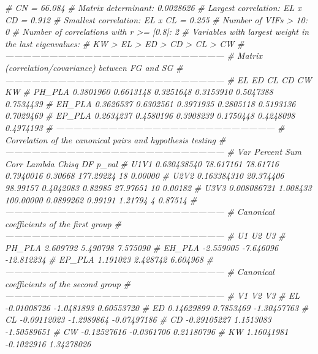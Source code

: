 \documentclass[
]{book}
\newenvironment{Shaded}{\begin{snugshade}}{\end{snugshade}}
\newcommand{\CommentTok}[1]{\textcolor[rgb]{0.56,0.35,0.01}{\textit{#1}}}
\begin{document}
\begin{Shaded}
\begin{Highlighting}[]
\CommentTok{# CN = 66.084}
\CommentTok{# Matrix determinant: 0.0028626 }
\CommentTok{# Largest correlation: EL x CD = 0.912 }
\CommentTok{# Smallest correlation: EL x CL = 0.255 }
\CommentTok{# Number of VIFs > 10: 0 }
\CommentTok{# Number of correlations with r >= |0.8|: 2 }
\CommentTok{# Variables with largest weight in the last eigenvalues: }
\CommentTok{# KW > EL > ED > CD > CL > CW }
\CommentTok{# ---------------------------------------------------------------------------}
\CommentTok{# Matrix (correlation/covariance) between FG and SG}
\CommentTok{# ---------------------------------------------------------------------------}
\CommentTok{#               EL        ED        CL        CD        CW        KW}
\CommentTok{# PH_PLA 0.3801960 0.6613148 0.3251648 0.3153910 0.5047388 0.7534439}
\CommentTok{# EH_PLA 0.3626537 0.6302561 0.3971935 0.2805118 0.5193136 0.7029469}
\CommentTok{# EP_PLA 0.2634237 0.4580196 0.3908239 0.1750448 0.4248098 0.4974193}
\CommentTok{# ---------------------------------------------------------------------------}
\CommentTok{# Correlation of the canonical pairs and hypothesis testing }
\CommentTok{# ---------------------------------------------------------------------------}
\CommentTok{#              Var   Percent       Sum      Corr  Lambda     Chisq DF   p_val}
\CommentTok{# U1V1 0.630438540 78.617161  78.61716 0.7940016 0.30668 177.29224 18 0.00000}
\CommentTok{# U2V2 0.163384310 20.374406  98.99157 0.4042083 0.82985  27.97651 10 0.00182}
\CommentTok{# U3V3 0.008086721  1.008433 100.00000 0.0899262 0.99191   1.21794  4 0.87514}
\CommentTok{# ---------------------------------------------------------------------------}
\CommentTok{# Canonical coefficients of the first group }
\CommentTok{# ---------------------------------------------------------------------------}
\CommentTok{#               U1        U2         U3}
\CommentTok{# PH_PLA  2.609792  5.490798   7.575090}
\CommentTok{# EH_PLA -2.559005 -7.646096 -12.812234}
\CommentTok{# EP_PLA  1.191023  2.428742   6.604968}
\CommentTok{# ---------------------------------------------------------------------------}
\CommentTok{# Canonical coefficients of the second group }
\CommentTok{# ---------------------------------------------------------------------------}
\CommentTok{#             V1         V2          V3}
\CommentTok{# EL -0.01008726 -1.0481893  0.60553720}
\CommentTok{# ED  0.14629899  0.7853469 -1.30457763}
\CommentTok{# CL -0.09112023 -1.2989864 -0.07497186}
\CommentTok{# CD -0.29105227  1.1513083 -1.50589651}
\CommentTok{# CW -0.12527616 -0.0361706  0.21180796}
\CommentTok{# KW  1.16041981 -0.1022916  1.34278026}

\end{Highlighting}
\end{Shaded}
\end{document}
